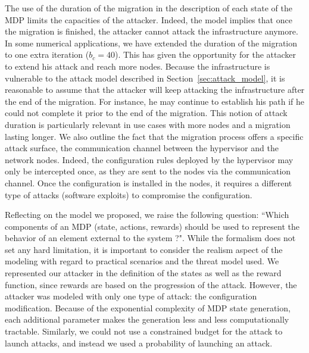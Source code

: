 The use of the duration of the migration in the description of each state of the MDP limits the capacities of the attacker. Indeed, the model implies that once the migration is finished, the attacker cannot attack the infrastructure anymore. 
In some numerical applications, we have extended the duration of the migration to one extra iteration ($b_c = 40$). This has given the opportunity for the attacker to extend his attack and reach more nodes.
Because the infrastructure is vulnerable to the attack model described in Section~\ref{sec:attack_model}, it is reasonable to assume that the attacker will keep attacking the infrastructure after the end of the migration. For instance, he may continue to establish his path if he could not complete it prior to the end of the migration. This notion of attack duration is particularly relevant in use cases with more nodes and a migration lasting longer. 
We also outline the fact that the migration process offers a specific attack surface, the communication channel between the hypervisor and the network nodes. Indeed, the configuration rules deployed by the hypervisor may only be intercepted once, as they are sent to the nodes via the communication channel. Once the configuration is installed in the nodes, it requires a different type of attacks (\eg software exploits) to compromise the configuration.

Reflecting on the model we proposed, we raise the following question: ``Which components of an MDP (state, actions, rewards) should be used to represent the behavior of an element external to the system ?". While the formalism does not set any hard limitation, it is important to consider the realism aspect of the modeling with regard to practical scenarios and the threat model used. We represented our attacker in the definition of the states as well as the reward function, since rewards are based on the progression of the attack. 
However, the attacker was modeled with only one type of attack: the configuration modification. Because of the exponential complexity of MDP state generation, each additional parameter makes the generation less and less computationally tractable. Similarly, we could not use a constrained budget for the attack to launch attacks, and instead we used a probability of launching an attack.

